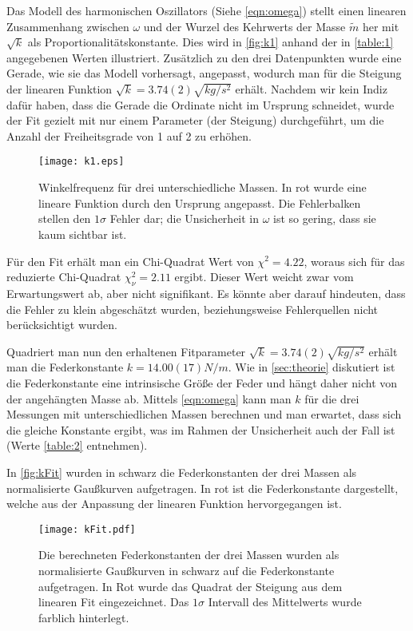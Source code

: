 Das Modell des harmonischen Oszillators (Siehe \autoref{eqn:omega}) stellt einen linearen Zusammenhang zwischen \( \omega \) und der Wurzel des Kehrwerts der Masse \( \tilde{m} \) her mit\( \sqrt{k} \) als Proportionalitätskonstante. Dies wird in \autoref{fig:k1} anhand der in \autoref{table:1} angegebenen Werten illustriert. Zusätzlich zu den drei Datenpunkten wurde eine Gerade, wie sie das Modell vorhersagt, angepasst, wodurch man für die Steigung der linearen Funktion \( \sqrt{k} = 3.74(2) \unit{\sqrt{kg / s^2}} \) erhält. Nachdem wir kein Indiz dafür haben, dass die Gerade die Ordinate nicht im Ursprung schneidet, wurde der Fit gezielt mit nur einem Parameter (der Steigung) durchgeführt, um die Anzahl der Freiheitsgrade von 1 auf 2 zu erhöhen. 

\begin{figure}[H]
	\centering
	\texttt{[image: k1.eps]}
	\caption[Zusammenhang zwischen \( \omega \) und \( \tilde{m} \)]{Winkelfrequenz für drei unterschiedliche Massen. In rot wurde eine lineare Funktion durch den Ursprung angepasst. Die Fehlerbalken stellen den $1\sigma$ Fehler dar; die Unsicherheit in \( \omega \) ist so gering, dass sie kaum sichtbar ist.}
	\label{fig:k1}
\end{figure}

Für den Fit erhält man ein Chi-Quadrat Wert von \( \chi^2 = 4.22 \), woraus sich für das reduzierte Chi-Quadrat \( \chi_{\nu}^2 = 2.11 \) ergibt. Dieser Wert weicht zwar vom Erwartungswert ab, aber nicht signifikant. Es könnte aber darauf hindeuten, dass die Fehler zu klein abgeschätzt wurden, beziehungsweise Fehlerquellen nicht berücksichtigt wurden. 

Quadriert man nun den erhaltenen Fitparameter \( \sqrt{k} = 3.74(2) \unit{\sqrt{kg / s^2}} \) erhält man die Federkonstante \( k = 14.00(17) \unit{N/m} \). Wie in \autoref{sec:theorie} diskutiert ist die Federkonstante eine intrinsische Größe der Feder und hängt daher nicht von der angehängten Masse ab. Mittels \autoref{eqn:omega} kann man \( k \) für die drei Messungen mit unterschiedlichen Massen berechnen und man erwartet, dass sich die gleiche Konstante ergibt, was im Rahmen der Unsicherheit auch der Fall ist (Werte \autoref{table:2} entnehmen). 

In \autoref{fig:kFit} wurden in schwarz die Federkonstanten der drei Massen als normalisierte Gaußkurven aufgetragen. In rot ist die Federkonstante dargestellt, welche aus der Anpassung der linearen Funktion hervorgegangen ist.
\begin{figure}[H]
	\centering
	\texttt{[image: kFit.pdf]}
	\caption[Vergleich der Federkonstanten als normalisierte Gaußkurven]{Die berechneten Federkonstanten der drei Massen wurden als normalisierte Gaußkurven in schwarz auf die Federkonstante aufgetragen. In Rot wurde das Quadrat der Steigung aus dem linearen Fit eingezeichnet. Das \( 1\sigma \) Intervall des Mittelwerts wurde farblich hinterlegt.}
	\label{fig:kFit}
\end{figure}

